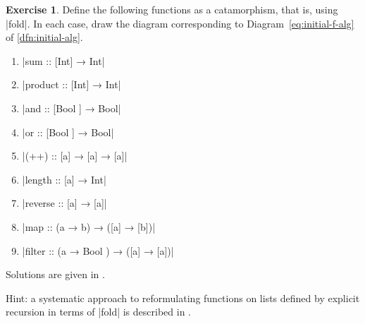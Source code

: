 \documentclass[a4paper,11pt, oneside,titlepage=false]{scrbook}
\theoremstyle{plain}
\theoremstyle{definition}
\newtheorem{exer}[thm]{Exercise}
\newcommand{\Catb}[1]{\mathbf{#1}}
\newcommand{\List}{\Catb{List}}
\newcommand{\projl}{\ensuremath{\pi_l}}
\newcommand{\catam}[1]{\llparenthesis #1 \rrparenthesis}
\newcommand{\NN}{\ensuremath{\mathbb{N}}}
\begin{document}
\begin{exer}\label{exer:list-functions-as-fold}
  Define the following functions as a catamorphism, that is, using |fold|.
  In each case, draw the diagram corresponding to Diagram~\ref{eq:initial-f-alg} of \cref{dfn:initial-alg}.
  \begin{enumerate}
  \item |sum :: [Int] →  Int|
  \item |product :: [Int] →  Int|
  \item |and :: [Bool ] →  Bool|
  \item |or :: [Bool ] →  Bool|
  \item |(++) :: [a] →  [a] →  [a]|
  \item |length :: [a] →  Int|
  \item |reverse :: [a] →  [a]|
  \item |map :: (a →  b) →  ([a] →  [b])|
  \item |filter :: (a →  Bool ) →  ([a] →  [a])|
  \end{enumerate}
  Solutions are given in \cite[\S2]{DBLP:journals/jfp/Hutton99}.

  Hint: a systematic approach to reformulating functions on lists defined by explicit recursion in terms of |fold| is described in \cite[\S3.3]{DBLP:journals/jfp/Hutton99}.
\end{exer}

%
%
%
%
%
\end{document}
